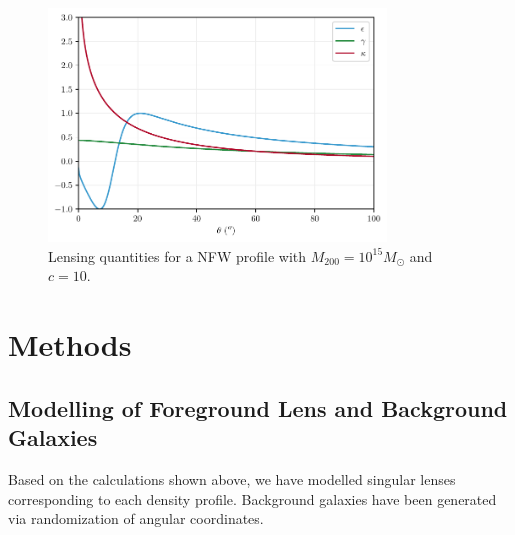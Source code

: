 \documentclass[10pt]{article}
\begin{document}
\begin{figure}
    \centering
    \includegraphics[width=0.8\textwidth]{nfwproperties.pdf}
    \caption{Lensing quantities for a NFW profile with $M_{200} = 10^{15} M_\odot$ and $c = 10$.}
    \label{}
\end{figure}




\section{Methods}

\subsection{Modelling of Foreground Lens and Background Galaxies}
Based on the calculations shown above, we have modelled singular lenses corresponding to each density profile.
 Background galaxies have been generated via randomization of angular coordinates.
\end{document}

